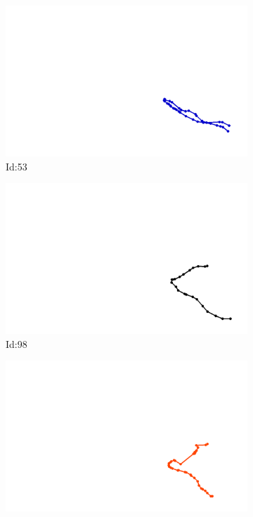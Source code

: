 \documentclass[12pt,twoside]{report}
\begin{document}
\begin{figure}
\centering
\begin{subfigure}[b]{0.20\textwidth}
\centering
\includegraphics[width=\textwidth]{../trajectories/53.png}
\caption{Id:53}
\end{subfigure}
\begin{subfigure}[b]{0.20\textwidth}
\centering
\includegraphics[width=\textwidth]{../trajectories/98.png}
\caption{Id:98}
\end{subfigure}
\begin{subfigure}[b]{0.20\textwidth}
\centering
\includegraphics[width=\textwidth]{../trajectories/223.png}

\end{subfigure}
\end{figure}
\end{document}
